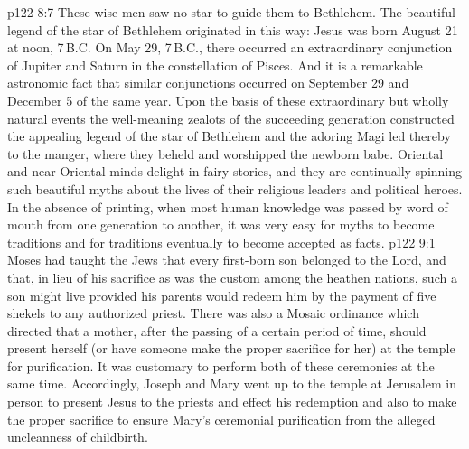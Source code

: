 \vs p122 8:7 These wise men saw no star to guide them to Bethlehem. The beautiful legend of the star of Bethlehem originated in this way: Jesus was born August 21 at noon, 7\,B.C. On May 29, 7\,B.C., there occurred an extraordinary conjunction of Jupiter and Saturn in the constellation of Pisces. And it is a remarkable astronomic fact that similar conjunctions occurred on September 29 and December 5 of the same year. Upon the basis of these extraordinary but wholly natural events the well\hyp{}meaning zealots of the succeeding generation constructed the appealing legend of the star of Bethlehem and the adoring Magi led thereby to the manger, where they beheld and worshipped the newborn babe. Oriental and near\hyp{}Oriental minds delight in fairy stories, and they are continually spinning such beautiful myths about the lives of their religious leaders and political heroes. In the absence of printing, when most human knowledge was passed by word of mouth from one generation to another, it was very easy for myths to become traditions and for traditions eventually to become accepted as facts.
\vs p122 9:1 Moses had taught the Jews that every first\hyp{}born son belonged to the Lord, and that, in lieu of his sacrifice as was the custom among the heathen nations, such a son might live provided his parents would redeem him by the payment of five shekels to any authorized priest. There was also a Mosaic ordinance which directed that a mother, after the passing of a certain period of time, should present herself (or have someone make the proper sacrifice for her) at the temple for purification. It was customary to perform both of these ceremonies at the same time. Accordingly, Joseph and Mary went up to the temple at Jerusalem in person to present Jesus to the priests and effect his redemption and also to make the proper sacrifice to ensure Mary’s ceremonial purification from the alleged uncleanness of childbirth.
